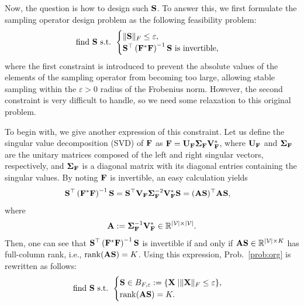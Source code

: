 \documentclass[10pt,journal]{IEEEtran}
\theoremstyle{plain}
\begin{document}
Now, the question is how to design such $\mathbf{S}$. To answer this, we first formulate the sampling operator design problem as the following feasibility problem:
\begin{align}\label{prob:org}
    \mbox{find }\mathbf{S}\mbox{ s.t. }
    \begin{cases}
    \|\mathbf{S}\|_F\leq\varepsilon,\\
    \mathbf{S}^\top\left(\mathbf{F}^*\mathbf{F}\right)^{-1}\mathbf{S} \mbox{ is invertible},
    \end{cases}
\end{align}
where the first constraint is introduced to prevent the absolute values of the elements of the sampling operator from becoming too large, allowing stable sampling within the $\varepsilon>0$ radius of the Frobenius norm. However, the second constraint is very difficult to handle, so we need some relaxation to this original problem.

To begin with, we give another expression of this constraint.
Let us define the singular value decomposition (SVD) of $\mathbf{F}$ as $\mathbf{F} = \mathbf{U}_{\mathbf{F}} \mathbf{\Sigma}_{\mathbf{F}} \mathbf{V}_{\mathbf{F}}^{*}$,
where $\mathbf{U_{\mathbf{F}}}$ and $ \mathbf{\Sigma_{\mathbf{F}}}$ are the unitary matrices composed of the left and right singular vectors, respectively, and $\mathbf{\Sigma}_{\mathbf{F}}$ is a diagonal matrix with its diagonal entries containing the singular values.
By noting $\mathbf{F}$ is invertible, an easy calculation yields
\begin{align}
    \mathbf{S}^\top\left(\mathbf{F}^*\mathbf{F}\right)^{-1}\mathbf{S}
    &= \mathbf{S}^\top\mathbf{V}_{\mathbf{F}}\mathbf{\Sigma}_{\mathbf{F}}^{-2}\mathbf{V}_{\mathbf{F}}^{*}\mathbf{S} = (\mathbf{A}\mathbf{S})^\top\mathbf{A}\mathbf{S},
\end{align}
where
\begin{equation}
\mathbf{A} := {\mathbf{\Sigma}}_{\mathbf{F}}^{-1}\mathbf{V}_{\mathbf{F}}^{*}\in\mathbb{R}^{|\mathcal{V}| \times |\mathcal{V}|}.
\end{equation}
Then, one can see that $\mathbf{S}^\top\left(\mathbf{F}^*\mathbf{F}\right)^{-1}\mathbf{S}$ is invertible if and only if $\mathbf{A}\mathbf{S}\in\mathbb{R}^{|\mathcal{V}|\times K}$ has full-column rank, i.e., $\mathrm{rank}(\mathbf{A}\mathbf{S}) = K$.
Using this expression, Prob.~\eqref{prob:org} is rewritten as follows:
\begin{align}\label{prob:org2}
    \mbox{find }\mathbf{S}\mbox{ s.t. }
    \begin{cases}
    \mathbf{S}\in B_{F,\varepsilon}:=\{\mathbf{X}\;|\|\mathbf{X}\|_F\leq\varepsilon\},\\
    \mathrm{rank}(\mathbf{A}\mathbf{S}) = K.
    \end{cases}
\end{align}
\end{document}

